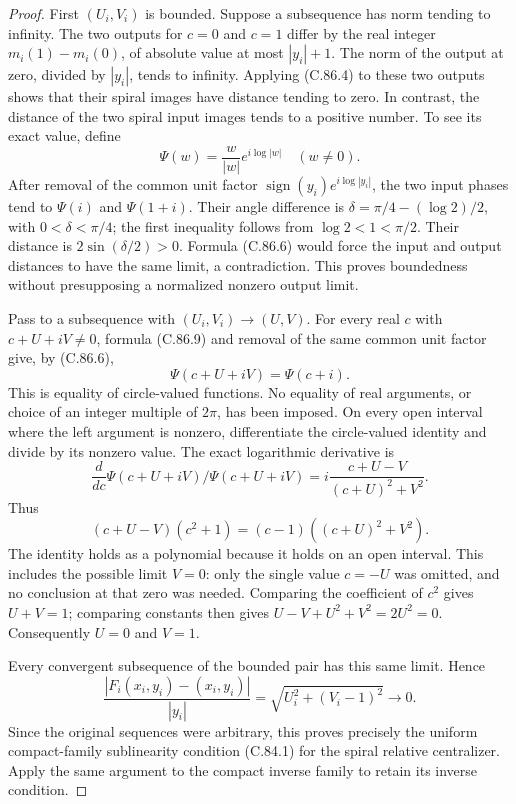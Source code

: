 \begin{proof}
First $(U_i,V_i)$ is bounded. Suppose a
subsequence has norm tending to infinity.
The two outputs for $c=0$ and $c=1$
differ by the real integer
$m_i(1)-m_i(0)$, of absolute value at
most $|y_i|+1$. The norm of the output
at zero, divided by $|y_i|$, tends to
infinity. Applying (C.86.4) to these
two outputs shows that their spiral
images have distance tending to zero.
In contrast, the distance of the two
spiral input images tends to a positive
number. To see its exact value, define
\[
       \Psi(w)=\frac{w}{|w|}e^{i\log|w|}
                         \quad(w\ne0).
                                                               \tag{C.86.10}
\]
After removal of the common unit factor
$\operatorname{sign}(y_i)e^{i\log|y_i|}$,
the two input phases tend to $\Psi(i)$
and $\Psi(1+i)$. Their angle difference
is
$\delta=\pi/4-(\log2)/2$, with
$0<\delta<\pi/4$; the first inequality
follows from $\log2<1<\pi/2$.
Their distance is $2\sin(\delta/2)>0$.
Formula (C.86.6) would force the input
and output distances to have the same
limit, a contradiction. This proves
boundedness without presupposing a
normalized nonzero output limit.

Pass to a subsequence with
$(U_i,V_i)\to(U,V)$. For every real
$c$ with $c+U+iV\ne0$, formula (C.86.9)
and removal of the same common unit
factor give, by (C.86.6),
\[
                     \Psi(c+U+iV)=\Psi(c+i).
                                                               \tag{C.86.11}
\]
This is equality of circle-valued
functions. No equality of real
arguments, or choice of an integer
multiple of $2\pi$, has been imposed.
On every open interval where the
left argument is nonzero, differentiate
the circle-valued identity and divide
by its nonzero value. The exact
logarithmic derivative is
\[
 \frac{d}{dc}\Psi(c+U+iV)\big/\Psi(c+U+iV)
       =i\frac{c+U-V}{(c+U)^2+V^2}.
                                                               \tag{C.86.12}
\]
Thus
\[
 (c+U-V)(c^2+1)
       =(c-1)((c+U)^2+V^2).                                    \tag{C.86.13}
\]
The identity holds as a polynomial
because it holds on an open interval.
This includes the possible limit
$V=0$: only the single value $c=-U$
was omitted, and no conclusion at
that zero was needed.
Comparing the coefficient of $c^2$
gives $U+V=1$; comparing constants
then gives
$U-V+U^2+V^2=2U^2=0$.
Consequently $U=0$ and $V=1$.

Every convergent subsequence of the
bounded pair has this same limit.
Hence
\[
 \frac{|F_i(x_i,y_i)-(x_i,y_i)|}{|y_i|}
           =\sqrt{U_i^2+(V_i-1)^2}\longrightarrow0.
                                                               \tag{C.86.14}
\]
Since the original sequences were
arbitrary, this proves precisely the
uniform compact-family sublinearity
condition (C.84.1) for the spiral
relative centralizer. Apply the same
argument to the compact inverse family
to retain its inverse condition.


\end{proof}
